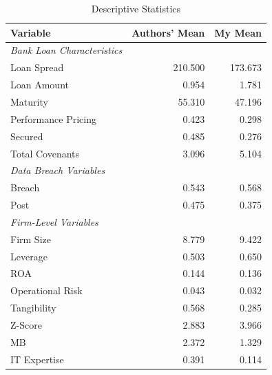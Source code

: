 \documentclass[11pt]{article}
\begin{document}
\begin{table}[ht]
  \centering
  \scriptsize
  \begin{tabular}{@{}lrr@{}}
    Variable                           & \textbf{Authors' Mean} & \textbf{My Mean} \\
    \midrule
    \textit{Bank Loan Characteristics} &                        &                  \\
    \quad Loan Spread                  & 210.500                & 173.673          \\
    \quad Loan Amount                  & 0.954                  & 1.781            \\
    \quad Maturity                     & 55.310                 & 47.196           \\
    \quad Performance Pricing          & 0.423                  & 0.298            \\
    \quad Secured                      & 0.485                  & 0.276            \\
    \quad Total Covenants              & 3.096                  & 5.104            \\

    \textit{Data Breach Variables}     &                        &                  \\
    \quad Breach                       & 0.543                  & 0.568            \\
    \quad Post                         & 0.475                  & 0.375            \\

    \textit{Firm-Level Variables}      &                        &                  \\
    \quad Firm Size                    & 8.779                  & 9.422            \\
    \quad Leverage                     & 0.503                  & 0.650            \\
    \quad          ROA                 & 0.144                  & 0.136            \\
    \quad Operational Risk             & 0.043                  & 0.032            \\
    \quad Tangibility                  & 0.568                  & 0.285            \\
    \quad Z-Score                      & 2.883                  & 3.966            \\
    \quad MB                           & 2.372                  & 1.329            \\
    \quad IT Expertise                 & 0.391                  & 0.114            \\
  \end{tabular}
  \caption{Descriptive Statistics}
  \label{tab:summary}
\end{table}
\end{document}
